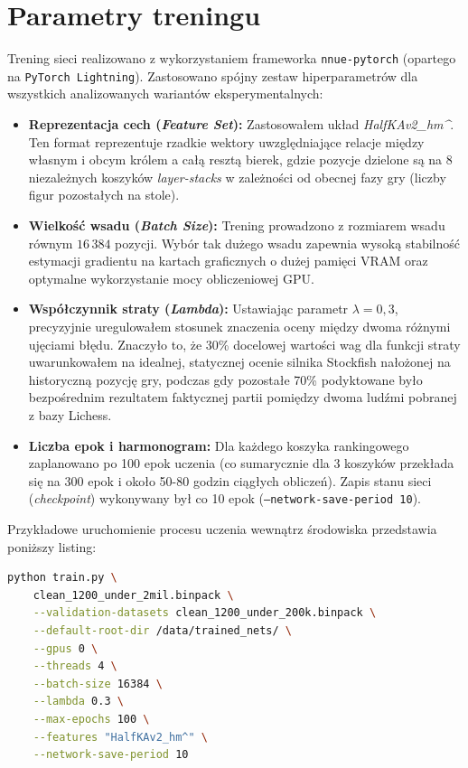 \documentclass[12pt,a4paper]{report}
\begin{document}
\section{Parametry treningu}

Trening sieci realizowano z wykorzystaniem frameworka \texttt{nnue-pytorch} (opartego na \texttt{PyTorch Lightning}). Zastosowano spójny zestaw hiperparametrów dla wszystkich analizowanych wariantów eksperymentalnych:

\begin{itemize}
    \item \textbf{Reprezentacja cech (\textit{Feature Set}):} Zastosowałem układ \textit{HalfKAv2\_hm\string^}. Ten format reprezentuje rzadkie wektory uwzględniające relacje między własnym i obcym królem a całą resztą bierek, gdzie pozycje dzielone są na 8 niezależnych koszyków \textit{layer-stacks} w zależności od obecnej fazy gry (liczby figur pozostałych na stole).
    \item \textbf{Wielkość wsadu (\textit{Batch Size}):} Trening prowadzono z rozmiarem wsadu równym $16\,384$ pozycji. Wybór tak dużego wsadu zapewnia wysoką stabilność estymacji gradientu na kartach graficznych o dużej pamięci VRAM oraz optymalne wykorzystanie mocy obliczeniowej GPU.
    \item \textbf{Współczynnik straty (\textit{Lambda}):} Ustawiając parametr $\lambda = 0{,}3$, precyzyjnie uregulowałem stosunek znaczenia oceny między dwoma różnymi ujęciami błędu. Znaczyło to, że 30\% docelowej wartości wag dla funkcji straty uwarunkowałem na idealnej, statycznej ocenie silnika Stockfish nałożonej na historyczną pozycję gry, podczas gdy pozostałe 70\% podyktowane było bezpośrednim rezultatem faktycznej partii pomiędzy dwoma ludźmi pobranej z bazy Lichess.
    \item \textbf{Liczba epok i harmonogram:} Dla każdego koszyka rankingowego zaplanowano po 100 epok uczenia (co sumarycznie dla 3 koszyków przekłada się na 300 epok i około 50-80 godzin ciągłych obliczeń). Zapis stanu sieci (\textit{checkpoint}) wykonywany był co 10 epok (\texttt{--network-save-period 10}).
\end{itemize}

Przykładowe uruchomienie procesu uczenia wewnątrz środowiska przedstawia poniższy listing:

\begin{lstlisting}[language=bash, caption=Polecenie uruchamiające proces uczenia na pierwszym koszyku Elo]
python train.py \
    clean_1200_under_2mil.binpack \
    --validation-datasets clean_1200_under_200k.binpack \
    --default-root-dir /data/trained_nets/ \
    --gpus 0 \
    --threads 4 \
    --batch-size 16384 \
    --lambda 0.3 \
    --max-epochs 100 \
    --features "HalfKAv2_hm^" \
    --network-save-period 10
\end{lstlisting}
\end{document}
